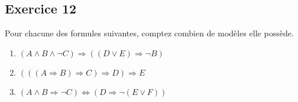 % 
% 
% 
% 
% 
% 
% 

% 

% 


\subsection*{Exercice 12}
Pour chacune des formules suivantes, comptez combien de modèles elle possède.
\begin{enumerate}
 \item $(A \land B \land \neg C) \Rightarrow ((D \lor E) \Rightarrow \neg B)$
 \item $(((A \Rightarrow B) \Rightarrow C) \Rightarrow D) \Rightarrow E$
 \item $(A \land B \Rightarrow \neg C) \Leftrightarrow (D \Rightarrow \neg (E \lor F))$
\end{enumerate}


